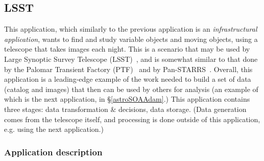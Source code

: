 \subsection{LSST \label{astroAdam}}

%



This application, which similarly to the previous application is an
{\em infrastructural application}, wants to find and study variable
objects and moving objects, using a telescope that takes images each
night. This is a scenario that may be used by Large Synoptic Survey
Telescope (LSST)~\cite{lsst}, and is somewhat similar to that done by
the Palomar Transient Factory (PTF)~\cite{ptf,ptf2,ptf3} and by
Pan-STARRS~\cite{ps1,ps2}.  Overall, this application is a
leading-edge example of the work needed to build a set of data
(catalog and images) that then can be used by others for analysis (an
example of which is the next application, in \S\ref{astroSOAAdam}.)
This application contains three stages: data transformation \&
decisions, data storage.
(Data generation comes from the telescope itself,
and processing is done outside of this application, e.g. using the next
application.)

\subsubsection*{Application description}


